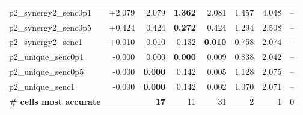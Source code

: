 \documentclass[11pt]{article}
\begin{document}
\begin{longtable}{lrrrrrrr}
p2\_synergy2\_senc0p1 & +2.079 & 2.079 & \textbf{1.362} & 2.081 & 1.457 & 4.048 & --\\
p2\_synergy2\_senc0p5 & +0.424 & 0.424 & \textbf{0.272} & 0.424 & 1.294 & 2.508 & --\\
p2\_synergy2\_senc1 & +0.010 & 0.010 & 0.132 & \textbf{0.010} & 0.758 & 2.074 & --\\
p2\_unique\_senc0p1 & -0.000 & 0.000 & \textbf{0.000} & 0.009 & 0.838 & 2.042 & --\\
p2\_unique\_senc0p5 & -0.000 & \textbf{0.000} & 0.142 & 0.005 & 1.128 & 2.075 & --\\
p2\_unique\_senc1 & -0.000 & \textbf{0.000} & 0.142 & 0.002 & 1.070 & 2.071 & --\\
\midrule
\textbf{\# cells most accurate} & & \textbf{17} & 11 & 31 & 2 & 1 & 0\\
\bottomrule\end{longtable}
\end{document}
